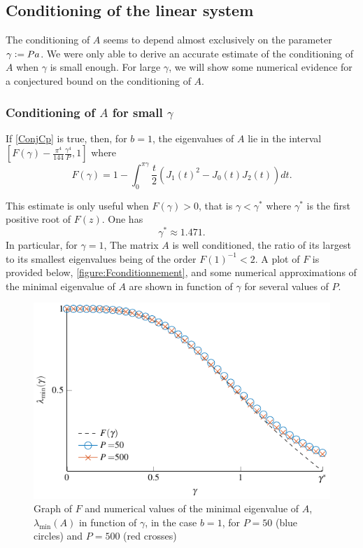 \documentclass[smallextended]{svjour3}
\begin{document}
\subsection{Conditioning of the linear system}
\newcommand{\Pa}{\gamma}
\newcommand{\Pastar}{\Pa^*}
The conditioning of $A$ seems to depend almost exclusively on the parameter $\Pa \isdef Pa$. We were only able to derive an accurate estimate of the conditioning of $A$ when $\Pa$ is small enough. For large $\Pa$, we will show some numerical evidence for a conjectured bound on the conditioning of $A$.

\subsubsection*{Conditioning of $A$ for small $\Pa$}
\begin{theorem} If \autoref{ConjCp} is true, then, for $b=1$, the eigenvalues of $A$ lie in the interval~ ${[F(\Pa) - \frac{\pi^4}{144}\frac{\gamma^4}{P},1]}$ where
	\[F(\Pa) = 1 - \int_{0}^{\pi \gamma} \frac{t}{2}(J_1(t)^2 - J_0(t)J_2(t) )dt.\]
	\label{The:lowBoundCon}
\end{theorem}
This estimate is only useful when ${F(\Pa) > 0}$, that is ${\Pa < \Pastar}$ where $\Pastar$ is the first positive root of $F(z)$. One has 
\[\Pastar \approx 1.471.\]	
In particular, for $\gamma = 1$, The matrix $A$ is well conditioned, the ratio of its largest to its smallest eigenvalues being of the order $F(1)^{-1} < 2$.
A plot of $F$ is provided below, \autoref{figure:Fconditionnement}, and some numerical approximations of the minimal eigenvalue of $A$ are shown in function of $\Pa$ for several values of $P$. 		
\begin{figure}[ht]
	\centering			
	\includegraphics[scale = 1]{Theorem4Fig}
	\caption{Graph of $F$ and numerical values of the minimal eigenvalue of $A$, $\lambda_{\min}(A)$ in function of $\Pa$, in the case $b=1$, for $P=50$ (blue circles) and $P=500$ (red crosses)}
	\label{figure:Fconditionnement}
\end{figure}
\end{document}
